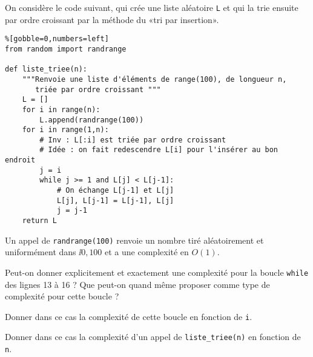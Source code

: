 \exer{}
\setcounter{numques}{0}

On considère le code suivant, qui crée une liste aléatoire \texttt L et qui la trie ensuite par ordre croissant par la méthode du «tri par insertion». 
\begin{lstlisting}%[gobble=0,numbers=left]
from random import randrange

def liste_triee(n):
    """Renvoie une liste d'éléments de range(100), de longueur n,
       triée par ordre croissant """
    L = []
    for i in range(n):
        L.append(randrange(100))
    for i in range(1,n):
        # Inv : L[:i] est triée par ordre croissant
        # Idée : on fait redescendre L[i] pour l'insérer au bon endroit
        j = i
        while j >= 1 and L[j] < L[j-1]:
            # On échange L[j-1] et L[j]
            L[j], L[j-1] = L[j-1], L[j]
            j = j-1
    return L
\end{lstlisting}
Un appel de \texttt{randrange(100)} renvoie un nombre tiré aléatoirement et uniformément dans $\ii{0,100}$ et a une complexité en $O(1)$. 

\medskip{}

\question{} Peut-on donner explicitement et exactement une complexité pour la boucle \texttt{while} des lignes 13 à 16 ? 
Que peut-on quand même proposer comme type de complexité pour cette boucle ? 

Donner dans ce cas la complexité de cette boucle en fonction de \texttt{i}. 

\question{} Donner dans ce cas la complexité d'un appel de \texttt{liste\_triee(n)} en fonction de \texttt n. 
